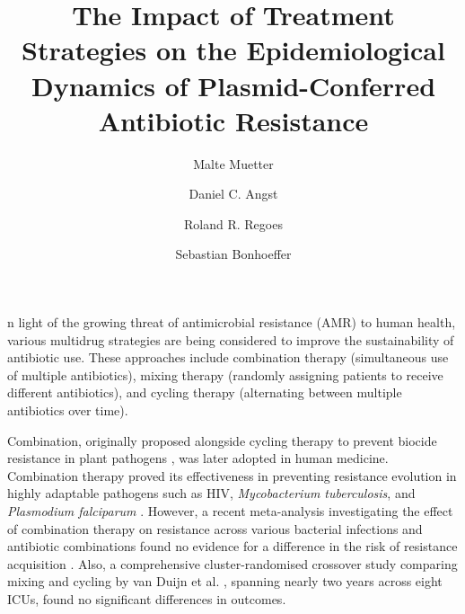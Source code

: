 \documentclass[9pt,twocolumn,twoside,lineno]{pnas-new}
\title{The Impact of Treatment Strategies on the Epidemiological Dynamics of Plasmid-Conferred Antibiotic Resistance}
\author[a,1]{Malte Muetter}
\author[a]{Daniel C. Angst}
\author[a]{Roland R. Regoes}
\author[a]{Sebastian Bonhoeffer}
\affil[a]{Institute of Integrative Biology, Department for Environmental System Science, ETH Zurich, 8092 Zurich, Switzerland}
\begin{document}
    \maketitle
    
    \thispagestyle{firststyle}
    

    
    n light of the growing threat of antimicrobial resistance (AMR) to human health, various multidrug strategies are being considered to improve the sustainability of antibiotic use.
    These approaches include combination therapy (simultaneous use of multiple antibiotics), mixing therapy (randomly assigning patients to receive different antibiotics), and cycling therapy (alternating between multiple antibiotics over time).

    Combination, originally proposed alongside cycling therapy to prevent biocide resistance in plant pathogens \cite{Kable1980, Delp1980, Skylakakis1981}, was later adopted in human medicine.
    Combination therapy proved its effectiveness in preventing resistance evolution in highly adaptable pathogens such as HIV, \textit{Mycobacterium tuberculosis}, and \textit{Plasmodium falciparum} \cite{Goldberg2012}. 
    However, a recent meta-analysis investigating the effect of combination therapy on resistance across various bacterial infections and antibiotic combinations found no evidence for a difference in the risk of resistance acquisition \cite{siedentop_metaanalysis_2024}. 
    Also, a comprehensive cluster-randomised crossover study comparing mixing and cycling by van Duijn et al. \cite{VanDuijn2018}, spanning nearly two years across eight ICUs, found no significant differences in outcomes.
    
\end{document}
